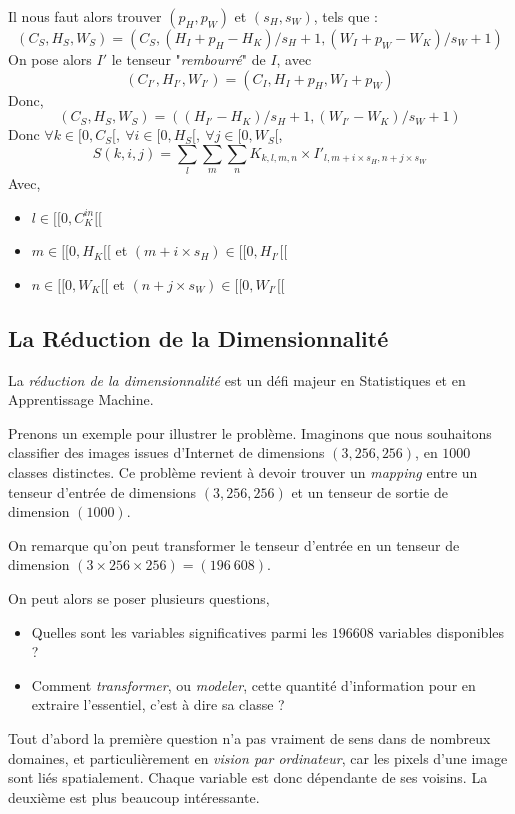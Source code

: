\documentclass[a4paper, 11pt]{report}
\begin{document}
Il nous faut alors trouver $(p_H, p_W)$ et $(s_H, s_W)$, tels que :
$$(C_S, H_S, W_S) = (C_S, (H_I + p_H - H_K) / s_H + 1, (W_I + p_W - W_K) / s_W + 1)$$
On pose alors $I'$ le tenseur "\emph{rembourré}" de $I$, avec 
$$(C_{I'}, H_{I'}, W_{I'}) = (C_I, H_I + p_H, W_I + p_W)$$
Donc,
$$(C_S, H_S, W_S) = ((H_{I'} - H_K) / s_H + 1, (W_{I'} - W_K) / s_W + 1)$$
Donc $\forall k \in [0, C_S[, \ \forall i \in [0, H_S[, \ \forall j \in [0, W_S[$,
$$S(k, i, j) = \sum_{l}\sum_{m}\sum_{n}{K_{k, l, m, n} \times {I'}_{l, m + i \times s_H, n + j \times s_W}}$$
Avec,
\begin{itemize}
	\item $l \in [\![0, C_K^{in}[\![$
	\item $m \in [\![0, H_K[\![$ et $(m + i \times s_H) \in [\![0, H_{I'}[\![$
	\item $n \in [\![0, W_K[\![$ et $(n + j \times s_W) \in [\![0, W_{I'}[\![$
\end{itemize}
\subsection{La Réduction de la Dimensionnalité}
La \emph{réduction de la dimensionnalité} \citep{Hinton2006} est un défi majeur en Statistiques et en Apprentissage Machine.

Prenons un exemple pour illustrer le problème.
Imaginons que nous souhaitons classifier des images issues d'Internet de dimensions $(3,256,256)$, en $1000$ classes distinctes.
Ce problème revient à devoir trouver un \emph{mapping} entre un tenseur d'entrée de dimensions $(3, 256, 256)$ et un tenseur de sortie de dimension $(1000)$.

On remarque qu'on peut transformer le tenseur d'entrée en un tenseur de dimension $(3 \times 256 \times 256) = (196\ 608)$.

On peut alors se poser plusieurs questions,
\begin{itemize}
	\item Quelles sont les variables significatives parmi les $196608$ variables disponibles ?
	\item Comment \emph{transformer}, ou \emph{modeler}, cette quantité d'information pour en extraire l'essentiel, c'est à dire sa classe ?
\end{itemize}

Tout d'abord la première question n'a pas vraiment de sens dans de nombreux domaines, et particulièrement en \emph{vision par ordinateur}, car les pixels d'une image sont liés spatialement. Chaque variable est donc dépendante de ses voisins.
La deuxième est plus beaucoup intéressante.
\end{document}
